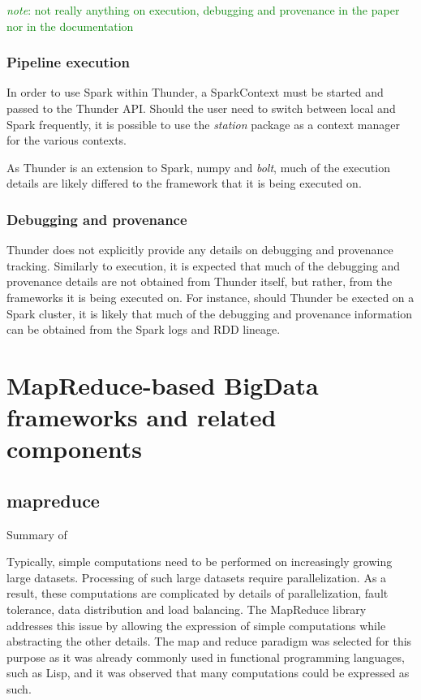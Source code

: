 \documentclass{report}
\newcommand{\note}[1]{\textcolor{green}{\textit{note}: #1}}
\begin{document}
        \note{not really anything on execution, debugging and provenance in the paper nor in the documentation}
        \subsection{Pipeline execution}
        In order to use Spark within Thunder, a SparkContext must be started and passed to the Thunder API. Should
        the user need to switch between local and Spark frequently, it is possible to use the \textit{station} package
        as a context manager for the various contexts.

        As Thunder is an extension to Spark, numpy and \textit{bolt}, much of the execution details are likely differed 
        to the 
        framework that it is being executed on.

        \subsection{Debugging and provenance}
        Thunder does not explicitly provide any details on debugging and provenance tracking. Similarly to execution,
        it is expected that much of the debugging and provenance details are not obtained from Thunder itself, but
        rather, from the frameworks it is being executed on. For instance, should Thunder be exected on a Spark cluster,
        it is likely that much of the debugging and provenance information can be obtained from the Spark logs and RDD
        lineage.
    
\chapter{MapReduce-based BigData frameworks and related components} 
    \section{mapreduce}
        Summary of ~\cite{mapred}

        Typically, simple computations need to be performed on 
        increasingly growing large datasets. Processing of such 
        large datasets require parallelization. As a result, 
        these computations are complicated by details of 
        parallelization, fault tolerance, data distribution and 
        load balancing. The MapReduce library addresses this issue 
        by allowing the expression of simple computations while 
        abstracting the other details. The map and reduce paradigm 
        was selected for this purpose as it was already commonly 
        used in functional programming languages, such as Lisp, and 
        it was observed that many computations could be expressed 
        as such.
\end{document}
